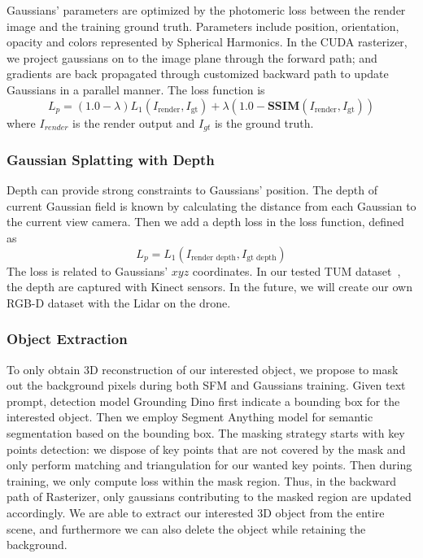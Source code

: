 \documentclass[conference]{IEEEtran}
\begin{document}
Gaussians’ parameters are optimized by the photomeric loss between the render image and the training ground truth. Parameters include position, orientation, opacity and colors represented by Spherical Harmonics. In the CUDA rasterizer, we project gaussians on to the image plane through the forward path; and gradients are back propagated through customized backward path to update Gaussians in a parallel manner. The loss function is 
\begin{equation}
    L_p=(1.0 - \lambda)L_{1}(I_{\text{render}}, I_{\text{gt}}) + \lambda(1.0 - \textbf{SSIM}(I_{\text{render}}, I_{\text{gt}}))
\end{equation} where $I_{render}$ is the render output and $I_{gt}$ is the ground truth.

\subsubsection{Gaussian Splatting with Depth}
Depth can provide strong constraints to Gaussians' position. The depth of current Gaussian field is known by calculating the distance from each Gaussian to the current view camera. Then we add a depth loss in the loss function, defined as
\begin{equation}
    L_p=L_{1}(I_{\text{render depth}}, I_{\text{gt depth}})
\end{equation}
The loss is related to Gaussians' $x y z$ coordinates. In our tested TUM dataset~\cite{tum}, the depth are captured with Kinect sensors. In the future, we will create our own RGB-D dataset with the Lidar on the drone.
\subsubsection{Object Extraction}
To only obtain 3D reconstruction of our interested object, we propose to mask out the background pixels during both SFM and Gaussians training. Given text prompt, detection model Grounding Dino \cite{dino} first indicate a bounding box for the interested object. Then we employ Segment Anything model \cite{sam} for semantic segmentation based on the bounding box. The masking strategy starts with key points detection: we dispose of key points that are not covered by the mask and only perform matching and triangulation for our wanted key points. Then during training, we only compute loss within the mask region. Thus, in the backward path of Rasterizer, only gaussians contributing to the masked region are updated accordingly. We are able to extract our interested 3D object from the entire scene, and furthermore we can also delete the object while retaining the background.
\end{document}
